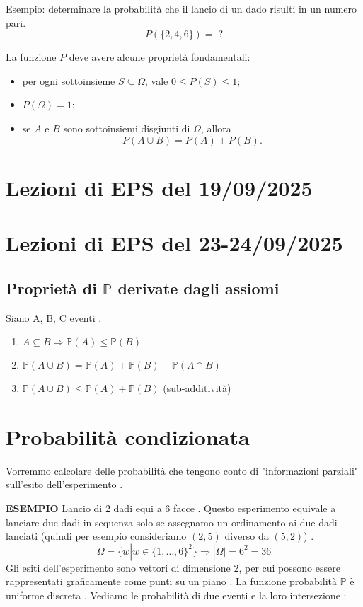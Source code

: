 \documentclass[12pt,a4paper, openany]{book}
\begin{document}
	Esempio: determinare la probabilità che il lancio di un dado risulti in un numero pari.
	\[
	P(\{2,4,6\}) = \; ?
	\]
	
	La funzione $P$ deve avere alcune proprietà fondamentali:
	\begin{itemize}
		\item per ogni sottoinsieme $S \subseteq \Omega$, vale $0 \leq P(S) \leq 1$;
		\item $P(\Omega) = 1$;
		\item se $A$ e $B$ sono sottoinsiemi disgiunti di $\Omega$, allora
		\[
		P(A \cup B) = P(A) + P(B).
		\]
	\end{itemize}
	\section*{Lezioni di EPS del 19/09/2025 }
	
	
	\section*{Lezioni di EPS del 23-24/09/2025 }
	
	\subsection*{Proprietà di $\mathbb{P}$ derivate dagli assiomi }
	Siano A, B, C eventi .
	\begin{enumerate}
		\item $A \subseteq B \Rightarrow \mathbb{P}(A) \leq \mathbb{P}(B)$ 
		\item $\mathbb{P}(A \cup B) = \mathbb{P}(A) + \mathbb{P}(B) - \mathbb{P}(A \cap B)$ 
		\item $\mathbb{P}(A \cup B) \leq \mathbb{P}(A) + \mathbb{P}(B)$ (sub-additività) 
	\end{enumerate}       
	
	\section*{Probabilità condizionata }
	Vorremmo calcolare delle probabilità che tengono conto di "informazioni parziali" sull'esito dell'esperimento .
	
	\textbf{ESEMPIO} Lancio di 2 dadi equi a 6 facce . Questo esperimento equivale a lanciare due dadi in sequenza solo se assegnamo un ordinamento ai due dadi lanciati (quindi per esempio consideriamo $(2, 5)$ diverso da $(5, 2)$) .
	$$ \Omega = \{ w | w \in \{1, \dots, 6\}^2\} \Rightarrow |\Omega| = 6^2 = 36 $$ 
	Gli esiti dell'esperimento sono vettori di dimensione 2, per cui possono essere rappresentati graficamente come punti su un piano . La funzione probabilità $\mathbb{P}$ è uniforme discreta . Vediamo le probabilità di due eventi e la loro intersezione :
	
\end{document}
